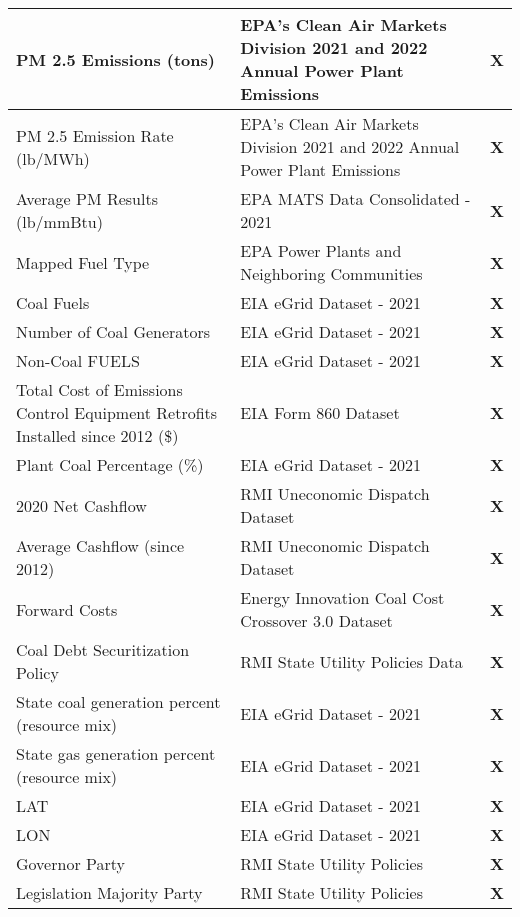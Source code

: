 \begin{table}[htb]
\begin{adjustbox}{width=\textwidth}
\begin{tabular}{|l | l | l |}
        PM 2.5 Emissions (tons) & EPA's Clean Air Markets Division 2021 and 2022 Annual Power Plant Emissions & \textbf{X} \\
        \midrule
        PM 2.5 Emission Rate (lb/MWh) & EPA's Clean Air Markets Division 2021 and 2022 Annual Power Plant Emissions & \textbf{X} \\
        \midrule
        Average PM Results (lb/mmBtu) & EPA MATS Data Consolidated - 2021 & \textbf{X} \\
        \midrule
        Mapped Fuel Type & EPA Power Plants and Neighboring Communities & \textbf{X} \\
        \midrule
        Coal Fuels & EIA eGrid Dataset - 2021 & \textbf{X} \\
        \midrule
        Number of Coal Generators & EIA eGrid Dataset - 2021 & \textbf{X} \\
        \midrule
        Non-Coal FUELS & EIA eGrid Dataset - 2021 & \textbf{X} \\
        \midrule
        Total Cost of Emissions Control Equipment Retrofits Installed since 2012 (\$) & EIA Form 860 Dataset & \textbf{X} \\
        \midrule
        Plant Coal Percentage (\%) & EIA eGrid Dataset - 2021 & \textbf{X} \\
        \midrule
        2020 Net Cashflow & RMI Uneconomic Dispatch Dataset & \textbf{X} \\
        \midrule
        Average Cashflow (since 2012) & RMI Uneconomic Dispatch Dataset & \textbf{X} \\
        \midrule
        Forward Costs & Energy Innovation Coal Cost Crossover 3.0 Dataset & \textbf{X} \\
        \midrule
        Coal Debt Securitization Policy & RMI State Utility Policies Data & \textbf{X} \\
        \midrule
        State coal generation percent (resource mix) & EIA eGrid Dataset - 2021 & \textbf{X} \\
        \midrule
        State gas generation percent (resource mix) & EIA eGrid Dataset - 2021 & \textbf{X} \\
        \midrule
        LAT & EIA eGrid Dataset - 2021 & \textbf{X} \\
        \midrule
        LON & EIA eGrid Dataset - 2021 & \textbf{X} \\
        \midrule
        Governor Party & RMI State Utility Policies & \textbf{X} \\
        \midrule
        Legislation Majority Party & RMI State Utility Policies & \textbf{X} \\

\end{tabular}
\end{adjustbox}
\end{table}
